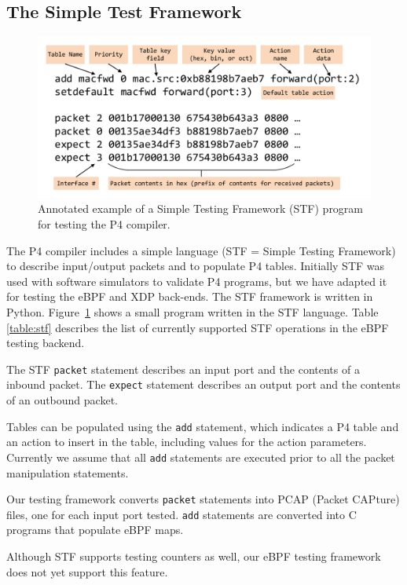 \subsection{The Simple Test Framework}
\begin{figure}
  \centering
  \includegraphics[width=\linewidth]{stf}
  \caption{Annotated example of a Simple Testing Framework (STF)
    program for testing the P4 compiler.}
  \label{fig:stf}
\end{figure}

The P4 compiler includes a simple language (STF = Simple Testing
Framework) to describe input/output packets and to populate P4 tables.
Initially STF was used with software simulators to validate P4
programs, but we have adapted it for testing the eBPF and XDP
back-ends.  The STF framework is written in Python.
Figure~\ref{fig:stf} shows a small program written in the STF
language.  Table \ref{table:stf} describes the list of currently
supported STF operations in the eBPF testing backend.

The STF \texttt{packet} statement describes an input port and the
contents of a inbound packet.  The \texttt{expect} statement describes
an output port and the contents of an outbound packet.

Tables can be populated using the \texttt{add} statement, which
indicates a P4 table and an action to insert in the table, including
values for the action parameters.  Currently we assume that all
\texttt{add} statements are executed prior to all the packet
manipulation statements.

Our testing framework converts \texttt{packet} statements into PCAP
(Packet CAPture) files, one for each input port tested.  \texttt{add}
statements are converted into C programs that populate eBPF maps.

Although STF supports testing counters as well, our eBPF testing
framework does not yet support this feature.

